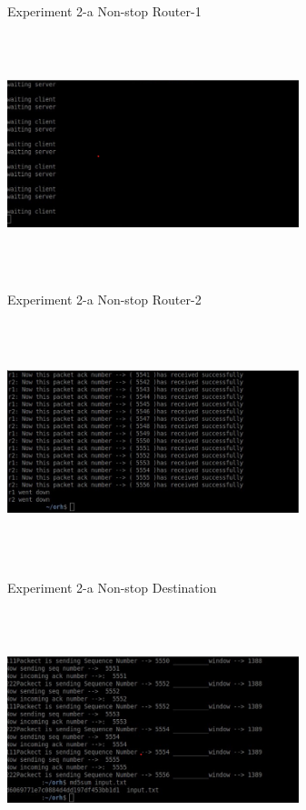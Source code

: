 \documentclass[letterpaper, 12 pt, conference]{ieeeconf}  %
\begin{document}
\begin{center}
Experiment 2-a Non-stop Router-1
\end{center}


\includegraphics[width=8.5cm, height=7cm]{Experiment 2-a-r2.png}

\begin{center}
Experiment 2-a Non-stop Router-2
\end{center}

\includegraphics[width=8.5cm, height=7cm]{Experiment 2-a-dest.png}

\begin{center}
Experiment 2-a Non-stop Destination
\end{center}



\includegraphics[width=8.5cm, height=7cm]{Experiment 2-b-sourcepng.png}
\end{document}
